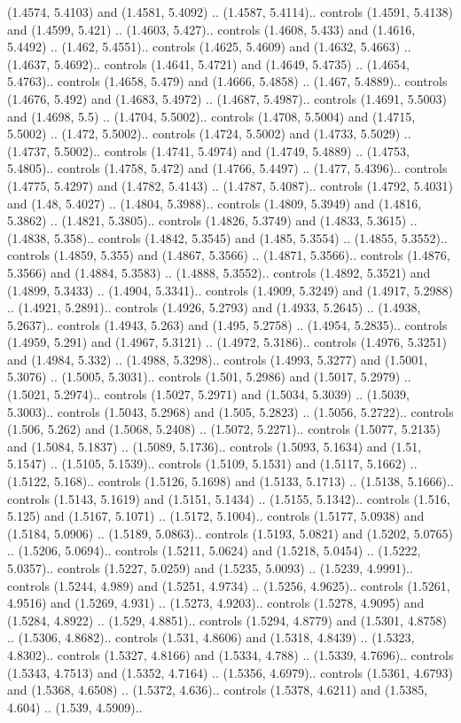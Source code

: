 (1.4574, 5.4103) and (1.4581, 5.4092) .. (1.4587, 5.4114).. controls (1.4591, 5.4138) and (1.4599, 5.421) .. (1.4603, 5.427).. controls (1.4608, 5.433) and (1.4616, 5.4492) .. (1.462, 5.4551).. controls (1.4625, 5.4609) and (1.4632, 5.4663) .. (1.4637, 5.4692).. controls (1.4641, 5.4721) and (1.4649, 5.4735) .. (1.4654, 5.4763).. controls (1.4658, 5.479) and (1.4666, 5.4858) .. (1.467, 5.4889).. controls (1.4676, 5.492) and (1.4683, 5.4972) .. (1.4687, 5.4987).. controls (1.4691, 5.5003) and (1.4698, 5.5) .. (1.4704, 5.5002).. controls (1.4708, 5.5004) and (1.4715, 5.5002) .. (1.472, 5.5002).. controls (1.4724, 5.5002) and (1.4733, 5.5029) .. (1.4737, 5.5002).. controls (1.4741, 5.4974) and (1.4749, 5.4889) .. (1.4753, 5.4805).. controls (1.4758, 5.472) and (1.4766, 5.4497) .. (1.477, 5.4396).. controls (1.4775, 5.4297) and (1.4782, 5.4143) .. (1.4787, 5.4087).. controls (1.4792, 5.4031) and (1.48, 5.4027) .. (1.4804, 5.3988).. controls (1.4809, 5.3949) and (1.4816, 5.3862) .. (1.4821, 5.3805).. controls (1.4826, 5.3749) and (1.4833, 5.3615) .. (1.4838, 5.358).. controls (1.4842, 5.3545) and (1.485, 5.3554) .. (1.4855, 5.3552).. controls (1.4859, 5.355) and (1.4867, 5.3566) .. (1.4871, 5.3566).. controls (1.4876, 5.3566) and (1.4884, 5.3583) .. (1.4888, 5.3552).. controls (1.4892, 5.3521) and (1.4899, 5.3433) .. (1.4904, 5.3341).. controls (1.4909, 5.3249) and (1.4917, 5.2988) .. (1.4921, 5.2891).. controls (1.4926, 5.2793) and (1.4933, 5.2645) .. (1.4938, 5.2637).. controls (1.4943, 5.263) and (1.495, 5.2758) .. (1.4954, 5.2835).. controls (1.4959, 5.291) and (1.4967, 5.3121) .. (1.4972, 5.3186).. controls (1.4976, 5.3251) and (1.4984, 5.332) .. (1.4988, 5.3298).. controls (1.4993, 5.3277) and (1.5001, 5.3076) .. (1.5005, 5.3031).. controls (1.501, 5.2986) and (1.5017, 5.2979) .. (1.5021, 5.2974).. controls (1.5027, 5.2971) and (1.5034, 5.3039) .. (1.5039, 5.3003).. controls (1.5043, 5.2968) and (1.505, 5.2823) .. (1.5056, 5.2722).. controls (1.506, 5.262) and (1.5068, 5.2408) .. (1.5072, 5.2271).. controls (1.5077, 5.2135) and (1.5084, 5.1837) .. (1.5089, 5.1736).. controls (1.5093, 5.1634) and (1.51, 5.1547) .. (1.5105, 5.1539).. controls (1.5109, 5.1531) and (1.5117, 5.1662) .. (1.5122, 5.168).. controls (1.5126, 5.1698) and (1.5133, 5.1713) .. (1.5138, 5.1666).. controls (1.5143, 5.1619) and (1.5151, 5.1434) .. (1.5155, 5.1342).. controls (1.516, 5.125) and (1.5167, 5.1071) .. (1.5172, 5.1004).. controls (1.5177, 5.0938) and (1.5184, 5.0906) .. (1.5189, 5.0863).. controls (1.5193, 5.0821) and (1.5202, 5.0765) .. (1.5206, 5.0694).. controls (1.5211, 5.0624) and (1.5218, 5.0454) .. (1.5222, 5.0357).. controls (1.5227, 5.0259) and (1.5235, 5.0093) .. (1.5239, 4.9991).. controls (1.5244, 4.989) and (1.5251, 4.9734) .. (1.5256, 4.9625).. controls (1.5261, 4.9516) and (1.5269, 4.931) .. (1.5273, 4.9203).. controls (1.5278, 4.9095) and (1.5284, 4.8922) .. (1.529, 4.8851).. controls (1.5294, 4.8779) and (1.5301, 4.8758) .. (1.5306, 4.8682).. controls (1.531, 4.8606) and (1.5318, 4.8439) .. (1.5323, 4.8302).. controls (1.5327, 4.8166) and (1.5334, 4.788) .. (1.5339, 4.7696).. controls (1.5343, 4.7513) and (1.5352, 4.7164) .. (1.5356, 4.6979).. controls (1.5361, 4.6793) and (1.5368, 4.6508) .. (1.5372, 4.636).. controls (1.5378, 4.6211) and (1.5385, 4.604) .. (1.539, 4.5909).. 